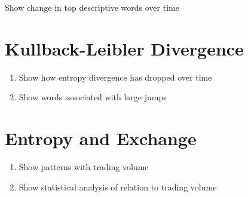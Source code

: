 Show change in top descriptive words over time

\section{Kullback-Leibler Divergence}

\begin{enumerate}
  \item Show how entropy divergence has dropped over time
  \item Show words associated with large jumps
\end{enumerate}

\section{Entropy and Exchange}
\begin{enumerate}
  \item Show patterns with trading volume
  \item Show statistical analysis of relation to trading volume
 \end{enumerate}


